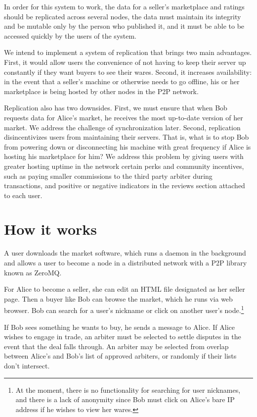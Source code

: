 \documentclass[12pt,twocolumn]{article}
\begin{document}
In order for this system to work, the data for a seller's marketplace and ratings should be replicated across several nodes, the data must maintain its integrity and be mutable only by the person who published it, and it must be able to be accessed quickly by the users of the system.

We intend to implement a system of replication that brings two main advantages.
First, it would allow users the convenience of not having to keep their server up constantly if they want buyers to see their wares.
Second, it increases availability: in the event that a seller's machine or otherwise needs to go offline, his or her marketplace is being hosted by other nodes in the P2P network.

Replication also has two downsides.
First, we must ensure that when Bob requests data for Alice's market, he receives the most up-to-date version of her market. We address the challenge of synchronization later.
Second, replication disincentivizes users from maintaining their servers. That is, what is to stop Bob from powering down or disconnecting his machine with great frequency if Alice is hosting his marketplace for him? We address this problem by giving users with greater hosting uptime in the network certain perks and community incentives, such as paying smaller commissions to the third party arbiter during transactions, and positive or negative indicators in the reviews section attached to each user.

\section{How it works}
A user downloads the market software, which runs a daemon in the background and allows a user to become a node in a distributed network with a P2P library known as ZeroMQ. 

For Alice to become a seller, she can edit an HTML file designated as her seller page.
Then a buyer like Bob can browse the market, which he runs via web browser.
Bob can search for a user's nickname or click on another user's node.\footnote{At the moment, there is no functionality for searching for user nicknames, and there is a lack of anonymity since Bob must click on Alice's bare IP address if he wishes to view her wares.}

If Bob sees something he wants to buy, he sends a message to Alice.
If Alice wishes to engage in trade, an arbiter must be selected to settle disputes in the event that the deal falls through.
An arbiter may be selected from overlap between Alice's and Bob's list of approved arbiters, or randomly if their lists don't intersect.
\end{document}
